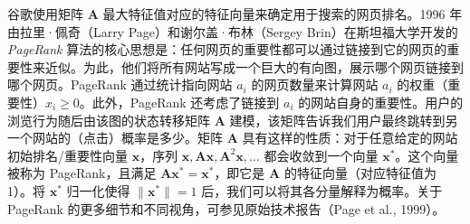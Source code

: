 \begin{notebox}
谷歌使用矩阵 $ \boldsymbol{A} $ 最大特征值对应的特征向量来确定用于搜索的网页排名。1996 年由拉里·佩奇（Larry Page）和谢尔盖·布林（Sergey Brin）在斯坦福大学开发的 \emph{PageRank} 算法的核心思想是：任何网页的重要性都可以通过链接到它的网页的重要性来近似。为此，他们将所有网站写成一个巨大的有向图，展示哪个网页链接到哪个网页。PageRank 通过统计指向网站 $ a_i $ 的网页数量来计算网站 $ a_i $ 的权重（重要性）$ x_i \ge 0 $。此外，PageRank 还考虑了链接到 $ a_i $ 的网站自身的重要性。用户的浏览行为随后由该图的状态转移矩阵 $ \boldsymbol{A} $ 建模，该矩阵告诉我们用户最终跳转到另一个网站的（点击）概率是多少。矩阵 $ \boldsymbol{A} $ 具有这样的性质：对于任意给定的网站初始排名/重要性向量 $ \boldsymbol{x} $，序列 $ \boldsymbol{x}, \boldsymbol{A}\boldsymbol{x}, \boldsymbol{A}^2\boldsymbol{x}, \ldots $ 都会收敛到一个向量 $ \boldsymbol{x}^* $。这个向量被称为 PageRank，且满足 $ \boldsymbol{A} \boldsymbol{x}^* = \boldsymbol{x}^* $，即它是 $ \boldsymbol{A} $ 的特征向量（对应特征值为 1）。将 $ \boldsymbol{x}^* $ 归一化使得 $ \|\boldsymbol{x}^*\| = 1 $ 后，我们可以将其各分量解释为概率。关于 PageRank 的更多细节和不同视角，可参见原始技术报告（Page et al., 1999）。
\end{notebox}
